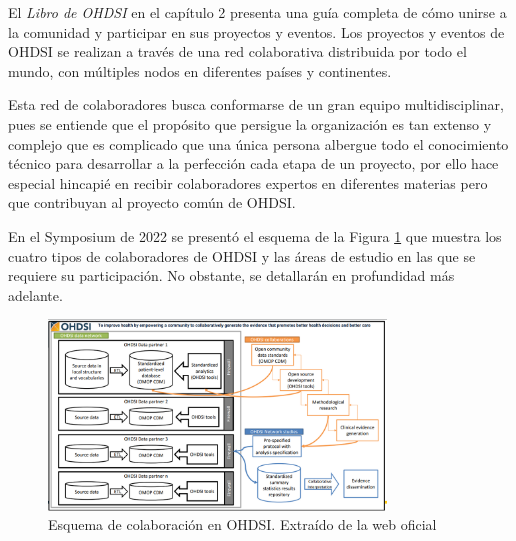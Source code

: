 El \textit{Libro de OHDSI} en el capítulo 2 presenta una guía completa de cómo unirse a la comunidad y participar en sus proyectos y eventos. Los proyectos y eventos de OHDSI se realizan a través de una red colaborativa distribuida por todo el mundo, con múltiples nodos en diferentes países y continentes.

Esta red de colaboradores busca conformarse de un gran equipo multidisciplinar, pues se entiende que el propósito que persigue la organización es tan extenso y complejo que es complicado que una única persona albergue todo el conocimiento técnico para desarrollar a la perfección cada etapa de un proyecto, por ello hace especial hincapié en recibir colaboradores expertos en diferentes materias pero que contribuyan al proyecto común de OHDSI.

En el Symposium de 2022 se presentó el esquema de la Figura \ref{fig:collaboratorsSchema} que muestra los cuatro tipos de colaboradores de OHDSI y las áreas de estudio en las que se requiere su participación. No obstante, se detallarán en profundidad más adelante.

\begin{figure}[H]
    \centering
    \includegraphics[width=0.80\textwidth]{figures/collaboratorsSchema.png}
    \caption{Esquema de colaboración en OHDSI. Extraído de la web oficial \cite{OHDSIwebsite}}
    \label{fig:collaboratorsSchema}
\end{figure}



